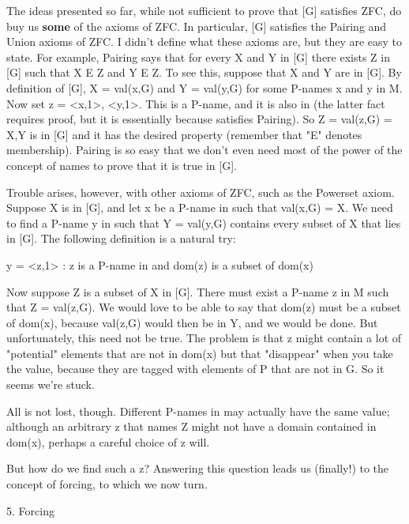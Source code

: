 \documentclass[10pt]{article}
\theoremstyle{definition}
\begin{document}
The ideas presented so far, while not sufficient to prove that [G]
satisfies ZFC, do buy us \textbf{some} of the axioms of ZFC.  In particular, [G]
satisfies the Pairing and Union axioms of ZFC.  I didn't define what these
axioms are, but they are easy to state.  For example, Pairing says that for
every X and Y in [G] there exists Z in [G] such that X E Z and Y E Z.  To
see this, suppose that X and Y are in [G].  By definition of [G],
X = val(x,G) and Y = val(y,G) for some P-names x and y in M.  Now set
z = {<x,1>, <y,1>}.  This is a P-name, and it is also in  (the latter
fact requires proof, but it is essentially because  satisfies Pairing).
So Z = val(z,G) = {X,Y} is in [G] and it has the desired property (remember
that "E" denotes membership).  Pairing is so easy that we don't even need
most of the power of the concept of names to prove that it is true in [G].

Trouble arises, however, with other axioms of ZFC, such as the Powerset
axiom.  Suppose X is in [G], and let x be a P-name in  such that
val(x,G) = X.  We need to find a P-name y in  such that Y = val(y,G)
contains every subset of X that lies in [G].  The following definition
is a natural try:

   y = {<z,1> : z is a P-name in  and dom(z) is a subset
                of dom(x)}

Now suppose Z is a subset of X in [G].  There must exist a P-name z in M
such that Z = val(z,G).  We would love to be able to say that dom(z) must be
a subset of dom(x), because val(z,G) would then be in Y, and we would be
done.  But unfortunately, this need not be true.  The problem is that z
might contain a lot of "potential" elements that are not in dom(x) but that
"disappear" when you take the value, because they are tagged with elements
of P that are not in G.  So it seems we're stuck.

All is not lost, though.  Different P-names in  may actually have the same
value; although an arbitrary z that names Z might not have a domain
contained in dom(x), perhaps a careful choice of z will.

But how do we find such a z?  Answering this question leads us (finally!) to
the concept of forcing, to which we now turn.


5. Forcing
\end{document}
